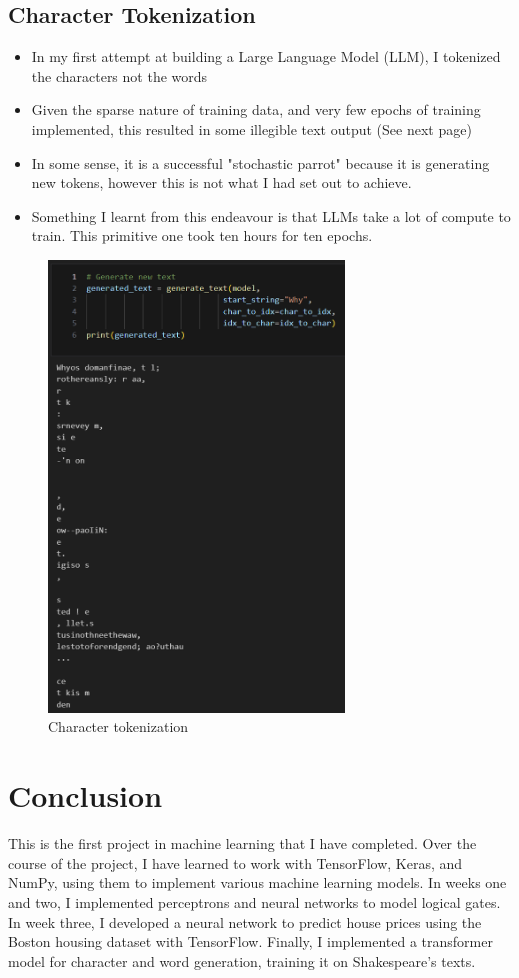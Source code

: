 \documentclass[12pt,a4paper]{article}
\begin{document}
\subsection{Character Tokenization}
\begin{itemize}
\item In my first attempt at building a Large Language Model (LLM), I tokenized the characters not the words
\item Given the sparse nature of training data, and very few epochs of training implemented, this resulted in some illegible text output (See next page)
\item In some sense, it is a successful "stochastic parrot" because it is generating new tokens, however this is not what I had set out to achieve. 
\item Something I learnt from this endeavour is that LLMs take a lot of compute to train. This primitive one took ten hours for ten epochs.
\end{itemize}
\pagebreak
\begin{figure}[h!]
    \centering
    \includegraphics[width=0.7\textwidth]{gen_1} 
    \caption{Character tokenization}
    \label{fig:example}
\end{figure}
\pagebreak
\section{Conclusion}
This is the first project in machine learning that I have completed. Over the course of the project, I have learned to work with TensorFlow, Keras, and NumPy, using them to implement various machine learning models. In weeks one and two, I implemented perceptrons and neural networks to model logical gates.
In week three, I developed a neural network to predict house prices using the Boston housing dataset with TensorFlow. Finally, I implemented a transformer model for character and word generation, training it on Shakespeare's texts.
\end{document}
